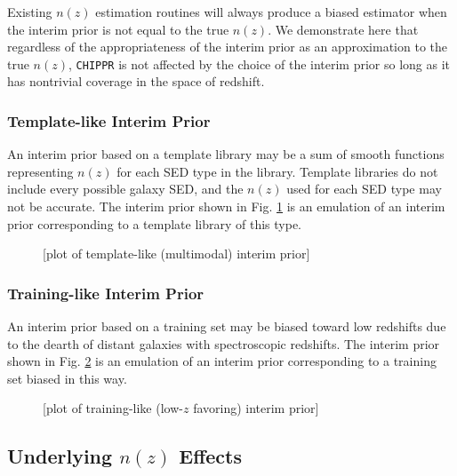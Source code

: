 \documentclass[iop]{emulateapj}
\newcommand{\chippr}{\texttt{CHIPPR} }
\begin{document}
Existing $n(z)$ estimation routines will always produce a biased estimator when 
the interim prior is not equal to the true $n(z)$.  We demonstrate here that 
regardless of the appropriateness of the interim prior as an approximation to 
the true $n(z)$, \chippr is not affected by the choice of the interim prior so 
long as it has nontrivial coverage in the space of redshift.

\subsubsection{Template-like Interim Prior}
\label{sec:tempintpr}

An interim prior based on a template library may be a sum of smooth functions 
representing $n(z)$ for each SED type in the library.  Template libraries do 
not include every possible galaxy SED, and the $n(z)$ used for each SED type 
may not be accurate.  The interim prior shown in Fig. \ref{fig:tempintpr} is an 
emulation of an interim prior corresponding to a template library of this type.

\begin{figure}
	\begin{center}
		\caption{[plot of template-like (multimodal) interim prior]}
		\label{fig:tempintpr}
	\end{center}
\end{figure}

\subsubsection{Training-like Interim Prior}
\label{sec:trainintpr}

An interim prior based on a training set may be biased toward low redshifts due 
to the dearth of distant galaxies with spectroscopic redshifts.  The interim 
prior shown in Fig. \ref{fig:trainintpr} is an emulation of an interim prior 
corresponding to a training set biased in this way.

\begin{figure}
	\begin{center}
		\caption{[plot of training-like (low-$z$ favoring) interim 
prior]}
		\label{fig:trainintpr}
	\end{center}
\end{figure}

\subsection{Underlying $n(z)$ Effects}
\label{sec:truth}
\end{document}
